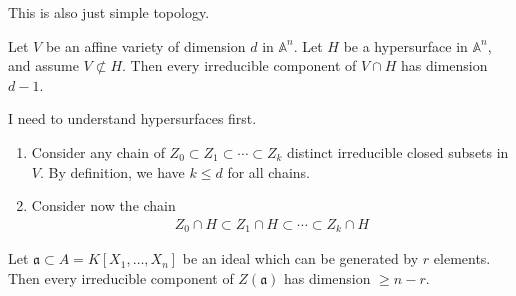 \begin{solution}
    This is also just simple topology.
\end{solution}
%
%
%
\begin{exercise}[1.8.]
    Let \(V\) be an affine variety of dimension \(d\) in \(\mathbb{A}^n\). Let \(H\) be a hypersurface in \(\mathbb{A}^n\), and assume \(V \not\subset H\). Then every irreducible component of \(V \cap H\) has dimension \(d - 1\).
\end{exercise}
\begin{solution}
    I need to understand hypersurfaces first.
    \begin{enumerate}
        \item Consider any chain of \(Z_0 \subset Z_1 \subset \cdots \subset Z_k\) distinct irreducible closed subsets in \(V\). By definition, we have \(k \leq d\) for all chains.
        \item Consider now the chain
        \begin{align*}
            Z_0 \cap H \subset Z_1\cap H \subset \cdots \subset Z_k \cap H
        \end{align*}
    \end{enumerate}
\end{solution}
\begin{exercise}
    Let \(\mathfrak{a} \subset A = K[X_1, \ldots, X_n]\) be an ideal which can be generated by \(r\) elements. Then every irreducible component of \(Z(\mathfrak{a})\) has dimension \(\geq n - r\).
\end{exercise}